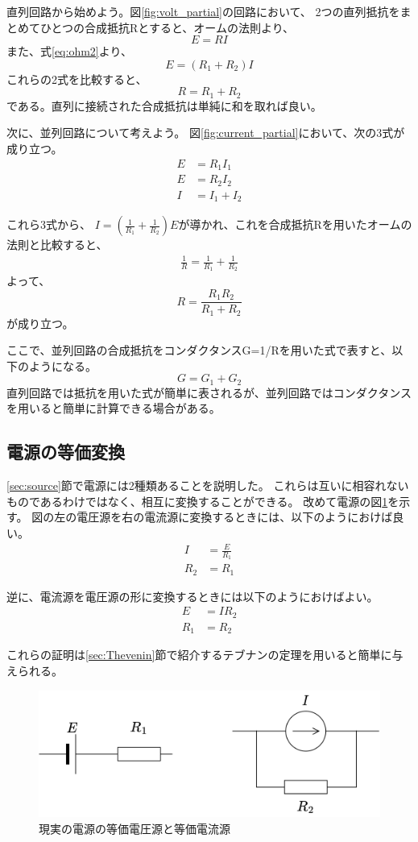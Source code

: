 \documentclass{ltjsreport}
\begin{document}
直列回路から始めよう。図\ref{fig:volt_partial}の回路において、
2つの直列抵抗をまとめてひとつの合成抵抗Rとすると、オームの法則より、
\[
  E = RI
\]
また、式\eqref{eq:ohm2}より、
\[
  E = (R_1+R_2)I
\]
これらの2式を比較すると、
\[
  R=R_1+R_2
\]
である。直列に接続された合成抵抗は単純に和を取れば良い。

次に、並列回路について考えよう。
図\ref{fig:current_partial}において、次の3式が成り立つ。
\begin{align}
  E &= R_1I_1\\
  E &= R_2I_2\\
  I &= I_1 + I_2
\end{align}

これら3式から、 $I = (\frac{1}{R_1} + \frac{1}{R_2}) E$が導かれ、これを合成抵抗Rを用いたオームの法則と比較すると、
\begin{align}
  \frac{1}{R} = \frac{1}{R_1} + \frac{1}{R_2}
\end{align}
よって、
\begin{equation}
  R = \frac{R_1R_2}{R_1+R_2}
\end{equation}
が成り立つ。

ここで、並列回路の合成抵抗をコンダクタンスG=1/Rを用いた式で表すと、以下のようになる。
\[
  G = G_1 + G_2
\]
直列回路では抵抗を用いた式が簡単に表されるが、並列回路ではコンダクタンスを用いると簡単に計算できる場合がある。
\subsection{電源の等価変換}
\ref{sec:source}節で電源には2種類あることを説明した。
これらは互いに相容れないものであるわけではなく、相互に変換することができる。
改めて電源の図\ref{fig:equvalent_source}を示す。
図の左の電圧源を右の電流源に変換するときには、以下のようにおけば良い。
\begin{align}
  I &= \frac{E}{R_1}\\
  R_2 &= R_1
\end{align}

逆に、電流源を電圧源の形に変換するときには以下のようにおけばよい。
\begin{align}
  E &= IR_2\\
  R_1 &= R_2
\end{align}

これらの証明は\ref{sec:Thevenin}節で紹介するテブナンの定理を用いると簡単に与えられる。
\begin{figure}[tb]
  \centering
  \includegraphics[keepaspectratio, scale=0.07]
       {img/real_battery2.drawio.png}
  \caption{現実の電源の等価電圧源と等価電流源}
  \label{fig:equvalent_source}
 \end{figure}
\end{document}
